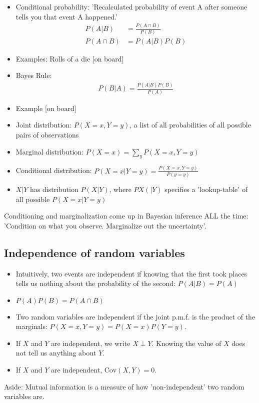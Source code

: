 \begin{itemize}
\item {Conditional probability:} 'Recalculated probability of event A after someone tells you that event A happened.' 
\begin{align}
P(A|B)&= \frac{P(A \cap B)}{P(B)}\\
P(A \cap B)&= P(A|B) P(B)
\end{align}
\item Examples: Rolls of a die
 [on board]
\item Bayes Rule: 
\begin{align}
P(B|A) = \frac{P(A|B) P(B)}{P(A)}
\end{align}
\end{itemize}

\begin{itemize} 
\item Example [on board]     
\item {Joint distribution:} $P(X=x, Y=y)$, a list of all probabilities of all possible pairs of observations
\item {Marginal distribution:} $P(X=x)=\sum_y P(X=x, Y=y) $
\item {Conditional distribution:} $P(X=x|Y=y) = \frac{P(X=x, Y=y)}{P(y=y)}$
\item $X |Y$ has distribution $P(X|Y)$, where $PX(|Y)$ specifies a 'lookup-table' of all possible $P(X=x| Y=y)$
\end{itemize}
Conditioning and marginalization come up in Bayesian inference ALL the time: 'Condition on what you observe. Marginalize out the uncertainty'.

\subsection{Independence of random variables}

\begin{itemize}
 \item Intuitively, two {events are independent} if knowing that the first took places tells us nothing about the probability of the second:  $P(A|B)= P(A)$
 \item  $P(A) P(B)= P(A \cap B)$
 \item  Two {random variables} are independent if the joint p.m.f. is the product of the marginals: $P(X=x,Y=y)=P(X=x) P(Y=y)$. 
 \item If $X$ and $Y$ are independent, we write $X \perp Y$. Knowing the value of $X$ does not tell us anything about $Y$.
 \item  If $X$ and $Y$ are independent, $\mbox{Cov}(X,Y)=0$.
 \end{itemize}
 Aside: Mutual information is a measure of how 'non-independent' two random variables are.


